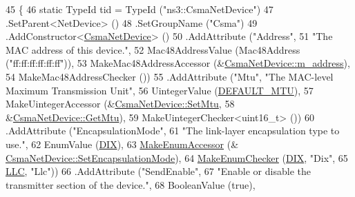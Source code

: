 \begin{DoxyCode}
45 \{
46   \textcolor{keyword}{static} TypeId tid = TypeId (\textcolor{stringliteral}{"ns3::CsmaNetDevice"})
47     .SetParent<NetDevice> ()
48     .SetGroupName (\textcolor{stringliteral}{"Csma"})
49     .AddConstructor<\hyperlink{classns3_1_1CsmaNetDevice_a5005a5403e112dad6ecd2922a9065916}{CsmaNetDevice}> ()
50     .AddAttribute (\textcolor{stringliteral}{"Address"}, 
51                    \textcolor{stringliteral}{"The MAC address of this device."},
52                    Mac48AddressValue (Mac48Address (\textcolor{stringliteral}{"ff:ff:ff:ff:ff:ff"})),
53                    MakeMac48AddressAccessor (&\hyperlink{classns3_1_1CsmaNetDevice_ae26602a3eb4e97c0aa39ae61b4d028f8}{CsmaNetDevice::m\_address}),
54                    MakeMac48AddressChecker ())
55     .AddAttribute (\textcolor{stringliteral}{"Mtu"}, \textcolor{stringliteral}{"The MAC-level Maximum Transmission Unit"},
56                    UintegerValue (\hyperlink{classns3_1_1CsmaNetDevice_aba1a157c1695a4c02b4dcba3490217e4}{DEFAULT\_MTU}),
57                    MakeUintegerAccessor (&\hyperlink{classns3_1_1CsmaNetDevice_a6fe6c073498c02fa0b01c64746f6166b}{CsmaNetDevice::SetMtu},
58                                          &\hyperlink{classns3_1_1CsmaNetDevice_a4c27c177803c2efbea66c14b66babd84}{CsmaNetDevice::GetMtu}),
59                    MakeUintegerChecker<uint16\_t> ())
60     .AddAttribute (\textcolor{stringliteral}{"EncapsulationMode"}, 
61                    \textcolor{stringliteral}{"The link-layer encapsulation type to use."},
62                    EnumValue (\hyperlink{classns3_1_1CsmaNetDevice_a176431468055d41f8e879e33a5362cada8cc8287029197a9496df00c6d3f8b9ff}{DIX}),
63                    \hyperlink{namespacens3_af5050739867ce63896dec011e332c8ec}{MakeEnumAccessor} (&
      \hyperlink{classns3_1_1CsmaNetDevice_abb8187ce567fde1aa17250f38751468b}{CsmaNetDevice::SetEncapsulationMode}),
64                    \hyperlink{namespacens3_a48832781a2b521d3d0091e05ece30615}{MakeEnumChecker} (\hyperlink{classns3_1_1CsmaNetDevice_a176431468055d41f8e879e33a5362cada8cc8287029197a9496df00c6d3f8b9ff}{DIX}, \textcolor{stringliteral}{"Dix"},
65                                     \hyperlink{classns3_1_1CsmaNetDevice_a176431468055d41f8e879e33a5362cadab3a0dd08ede5405aff1fd939e556dc5b}{LLC}, \textcolor{stringliteral}{"Llc"}))
66     .AddAttribute (\textcolor{stringliteral}{"SendEnable"}, 
67                    \textcolor{stringliteral}{"Enable or disable the transmitter section of the device."},
68                    BooleanValue (\textcolor{keyword}{true}),

\end{DoxyCode}
